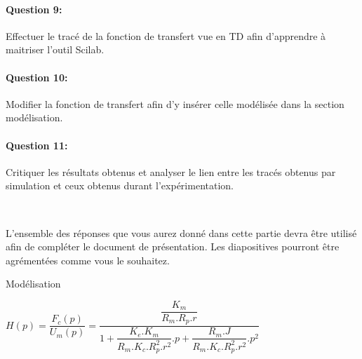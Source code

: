\paragraph{Question 9:} Effectuer le tracé de la fonction de transfert vue en TD afin d'apprendre à maitriser l'outil Scilab.

\paragraph{Question 10:} Modifier la fonction de transfert afin d'y insérer celle modélisée dans la section modélisation.

\paragraph{Question 11:} Critiquer les résultats obtenus et analyser le lien entre les tracés obtenus par simulation et ceux obtenus durant l'expérimentation.

~\

L'ensemble des réponses que vous aurez donné dans cette partie devra être utilisé afin de compléter le document de présentation. Les diapositives pourront être agrémentées comme vous le souhaitez.

\ifdef{\public}{}{}

\newpage

\pagestyle{correction}\setcounter{section}{0}

Modélisation
\begin{center}
$H(p)=\dfrac{F_c(p)}{U_m(p)}=\dfrac{\dfrac{K_m}{R_m.R_p.r}}{1+\dfrac{K_e.K_m}{R_m.K_c.R_p^2.r^2}.p+\dfrac{R_m.J}{R_m.K_c.R_p^2.r^2}.p^2}$
\end{center}


